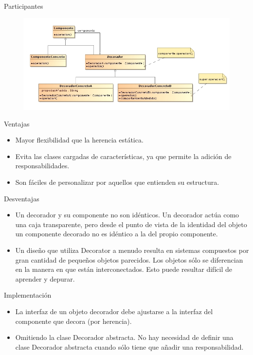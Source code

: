 \documentclass{beamer}
\begin{document}
\begin{frame}{Participantes}
  \begin{figure}
   \centering
    \includegraphics[scale=0.4]{1.jpg}
  \end{figure}
\end{frame}

\begin{frame}{Ventajas}
\begin{itemize}
 \item Mayor flexibilidad que la herencia estática.
 \item Evita las clases cargadas de características, ya que permite la adición de responsabilidades.
 \item Son fáciles de personalizar por aquellos que entienden su estructura. 
\end{itemize}
\end{frame}

\begin{frame}{Desventajas}
\begin{itemize}
 \item Un decorador y su componente no son idénticos. Un decorador actúa como una caja transparente, pero desde el punto de vista de la identidad del objeto un componente decorado no es idéntico a la del propio componente.
 \item Un diseño que utiliza Decorator a menudo resulta en sistemas compuestos por gran cantidad de pequeños objetos parecidos. Los objetos sólo se diferencian en la manera en que están interconectados. Esto puede resultar difícil de aprender y depurar.
 \end{itemize}	
\end{frame}

\begin{frame}{Implementación}
 \begin{itemize}
  \item La interfaz de un objeto decorador debe ajustarse a la interfaz del componente que decora (por herencia).
  \item Omitiendo la clase Decorador abstracta. No hay necesidad de definir una clase Decorador abstracta cuando sólo tiene que añadir una responsabilidad.
 \end{itemize}
\end{frame}
\end{document}
